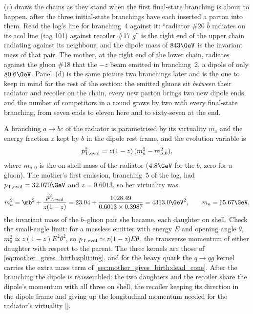 (c) draws the chains as they stand
when the first final-state branching is about to happen, after the three
initial-state branchings have each inserted a parton into them. Read the
log's line for branching~4 against it: ``radiator \#20 $\bar b$ radiates
on its acol line (tag 101) against recoiler \#17 $g$'' is the right end of
the upper chain radiating against its neighbour, and the dipole mass of
$843\GeV$ is the invariant mass of that pair. The mother, at the right end
of the lower chain, radiates against the gluon \#18 that the $-z$ beam
emitted in branching~2, a dipole of only $80.6\GeV$. Panel~(d) is the same
picture two branchings later and is the one to keep in mind for the rest
of the section: the emitted gluons sit \emph{between} their radiator and
recoiler on the chain, every new parton brings two new dipole ends, and
the number of competitors in a round grows by two with every final-state
branching, from seven ends to eleven here and to sixty-seven at the end.

A branching $a\to bc$ of the radiator is parametrised by its virtuality
$m_a$ and the energy fraction $z$ kept by $b$ in the dipole rest frame, and
the evolution variable is
\begin{equation}
  p_{\mathrm{T,evol}}^2=z(1-z)\,(m_a^2-m_{a,0}^2),
  \label{eq:mother_gives_birth:pt_evol_fsr}
\end{equation}
where $m_{a,0}$ is the on-shell mass of the radiator ($4.8\GeV$ for the $b$,
zero for a gluon). The mother's first emission, branching~5 of the log,
had $\ptevol=32.070\GeV$ and $z=0.6013$, so her virtuality was
\begin{equation*}
  m_a^2=\mb^2+\frac{\ptevol^2}{z(1-z)}
  =23.04+\frac{1028.49}{0.6013\times0.3987}=4313.0\GeV^2,
  \qquad m_a=65.67\GeV ,
\end{equation*}
the invariant mass of the $b$--gluon pair she became, each daughter on
shell. Check the small-angle limit: for a massless emitter with
energy $E$ and opening angle $\theta$, $m_a^2\simeq z(1-z)E^2\theta^2$, so
$p_{\mathrm{T,evol}}\simeq z(1-z)E\theta$, the transverse momentum of either
daughter with respect to the parent. The three kernels are those of
\cref{eq:mother_gives_birth:splitting}, and for the heavy quark the
$q\to qg$ kernel carries the extra mass term of
\cref{sec:mother_gives_birth:dead_cone}. After the branching the dipole is
reassembled: the two daughters and the recoiler share the dipole's momentum
with all three on shell, the recoiler keeping its direction in the dipole
frame and giving up the longitudinal momentum needed for the radiator's
virtuality [].

